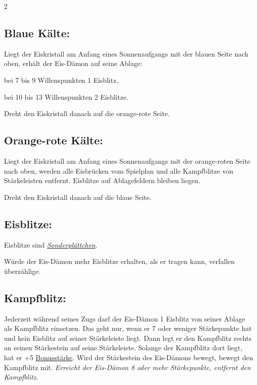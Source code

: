 \documentclass[10pt, a4paper, oneside]{book}
\newcommand{\fan}[1]{\textit{#1}}
\begin{document}
\begin{multicols*}{2}
\begin{nobgcolor}
\subsection{Blaue Kälte:}

Liegt der Eiskristall am Anfang eines Sonnenaufgangs mit der blauen Seite nach oben, erhält der Eis-Dämon auf seine Ablage:

\bullet{} bei 7 bis 9 Willenspunkten 1 Eisblitz,

\bullet{} bei 10 bis 13 Willenspunkten 2 Eisblitze.

Dreht den Eiskristall danach auf die orange-rote Seite.
\supercite{mh-kaelte,mh-begleitheft}


\subsection{Orange-rote Kälte:}

Liegt der Eiskristall am Anfang eines Sonnenaufgangs mit der orange-roten Seite nach oben, werden alle Eisbrücken vom Spielplan und alle Kampfblitze von Stärkeleisten entfernt. Eisblitze auf Ablagefeldern bleiben liegen.

Dreht den Eiskristall danach auf die blaue Seite.
\supercite{mh-kaelte,mh-begleitheft}




\subsection{Eisblitze:}

Eisblitze sind \hyperref[gegenstaende-und-sonderplaettchen]{\fan{Sonderplättchen}}. 

Würde der Eis-Dämon mehr Eisblitze erhalten, als er tragen kann, verfallen überzählige.
\supercite{mh-begleitheft}



\columnbreak


\subsection{Kampfblitz:}


Jederzeit während seines Zugs darf der Eis-Dämon 1 Eisblitz von seiner Ablage als Kampfblitz einsetzen. Das geht nur, wenn er 7 oder weniger Stärkepunkte hat und kein Eisblitz auf seiner Stärkeleiste liegt.
\supercite{mh-kaelte}
Dann legt er den Kampfblitz rechts an seinen Stärkestein auf seine Stärkeleiste. Solange der Kampfblitz dort liegt, hat er +5 \hyperref[bonusstaerke]{Bonusstärke}.
\supercite{mh-begleitheft}
Wird der Stärkestein des Eis-Dämons bewegt, bewegt den Kampfblitz mit.
\supercite{88778} 
\fan{Erreicht der Eis-Dämon 8 oder mehr Stärkepunkte, entfernt den Kampfblitz.}





\end{nobgcolor}
\end{multicols*}
\end{document}
